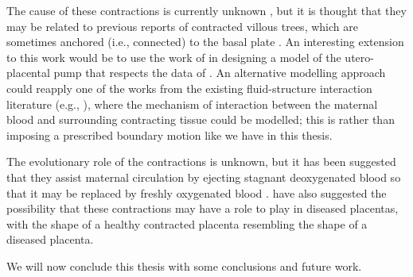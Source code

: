         The cause of these contractions is currently unknown \cite{dellschaftHaemodynamicsHumanPlacenta2020}, but it is thought that they may be related to previous reports of contracted villous trees, which are sometimes anchored (i.e., connected) to the basal plate \cite{dellschaftHaemodynamicsHumanPlacenta2020,katoVillousTreeModel2017}. An interesting extension to this work would be to use the work of \citeauthor{katoVillousTreeModel2017} \cite{katoVillousTreeModel2017} in designing a model of the utero-placental pump that respects the data of \citeauthor{gowlandCharacterisingPlacentalContractions2024} \cite{gowlandCharacterisingPlacentalContractions2024}. An alternative modelling approach could reapply one of the works from the existing fluid-structure interaction literature (e.g., \cite{houNumericalMethodsFluidStructure2012,doneaArbitraryLagrangianEulerian2004,ricardodasilvaNumericalSimulationsFluidstructure2007,collisEffectiveEquationsGoverning2017,formaggiaCardiovascularMathematicsModeling2010}), where the mechanism of interaction between the maternal blood and surrounding contracting tissue could be modelled; this is rather than imposing a prescribed boundary motion like we have in this thesis. 

        The evolutionary role of the contractions is unknown, but it has been suggested that they assist maternal circulation by ejecting stagnant deoxygenated blood so that it may be replaced by freshly oxygenated blood \cite{dellschaftHaemodynamicsHumanPlacenta2020}. \citeauthor{dellschaftHaemodynamicsHumanPlacenta2020} \cite{dellschaftHaemodynamicsHumanPlacenta2020} have also suggested the possibility that these contractions may have a role to play in diseased placentas, with the shape of a healthy contracted placenta resembling the shape of a diseased placenta.

        We will now conclude this thesis with some conclusions and future work.